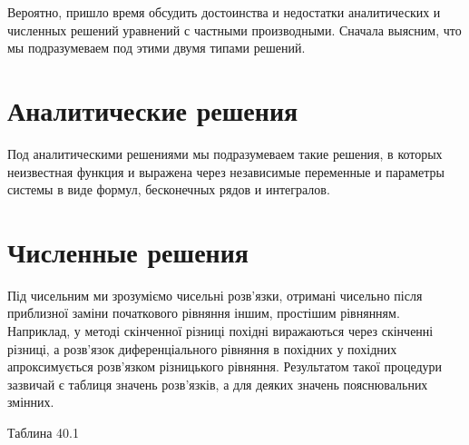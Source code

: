 \documentclass[
  ukrainian,
]{article}
\begin{document}
Вероятно, пришло время обсудить достоинства и недостатки аналитических и
численных решений уравнений с частными производными. Сначала выясним,
что мы подразумеваем под этими двумя типами решений.

\section{Аналитические
решения}\label{ux430ux43dux430ux43bux438ux442ux438ux447ux435ux441ux43aux438ux435-ux440ux435ux448ux435ux43dux438ux44f}

Под аналитическими решениями мы подразумеваем такие решения, в которых
неизвестная функция и выражена через независимые переменные и параметры
системы в виде формул, бесконечных рядов и интегралов.

\section{Численные
решения}\label{ux447ux438ux441ux43bux435ux43dux43dux44bux435-ux440ux435ux448ux435ux43dux438ux44f}

Під чисельним ми зрозуміємо чисельні розв'язки, отримані чисельно після
приблизної заміни початкового рівняння іншим, простішим рівнянням.
Наприклад, у методі скінченної різниці похідні виражаються через
скінченні різниці, а розв'язок диференціального рівняння в похідних у
похідних апроксимується розв'язком різницького рівняння. Результатом
такої процедури зазвичай є таблиця значень розв'язків, а для деяких
значень пояснювальних змінних.

Таблина 40.1
\end{document}
